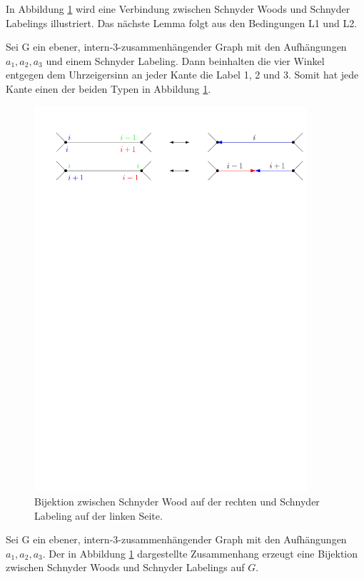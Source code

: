 In Abbildung \ref{schnyder_bij} wird eine Verbindung zwischen Schnyder Woods und Schnyder Labelings illustriert. Das nächste Lemma folgt aus den Bedingungen L1 und L2.

\begin{lemma}\label{lem_sl}
Sei G ein ebener, intern-3-zusammenhängender Graph mit den Aufhängungen $a_1,a_2,a_3$ und einem Schnyder Labeling. Dann beinhalten die vier Winkel entgegen dem Uhrzeigersinn an jeder Kante die Label 1, 2 und 3. Somit hat jede Kante einen der beiden Typen in Abbildung \ref{schnyder_bij}.
\end{lemma}

\begin{figure}[h]
	\centering
  \includegraphics[width=0.9\textwidth]{schnyder_bij.pdf}
	\caption{Bijektion zwischen Schnyder Wood auf der rechten und Schnyder Labeling auf der linken Seite.}
	\label{schnyder_bij}
\end{figure}

\begin{theorem}\label{theo_schnyder_bij}
Sei G ein ebener, intern-3-zusammenhängender Graph mit den Aufhängungen $a_1,a_2,a_3$. Der in Abbildung \ref{schnyder_bij} dargestellte Zusammenhang erzeugt eine Bijektion zwischen Schnyder Woods und Schnyder Labelings auf $G$.
\end{theorem}

